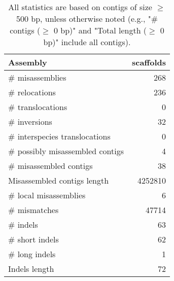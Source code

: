 \documentclass[12pt,a4paper]{article}
\begin{document}
\begin{table}[ht]
\begin{center}
\caption{All statistics are based on contigs of size $\geq$ 500 bp, unless otherwise noted (e.g., "\# contigs ($\geq$ 0 bp)" and "Total length ($\geq$ 0 bp)" include all contigs).}
\begin{tabular}{|l*{1}{|r}|}
\hline
Assembly & scaffolds \\ \hline
\# misassemblies & 268 \\ \hline
\hspace{5mm}\# relocations & 236 \\ \hline
\hspace{5mm}\# translocations & 0 \\ \hline
\hspace{5mm}\# inversions & 32 \\ \hline
\hspace{5mm}\# interspecies translocations & 0 \\ \hline
\# possibly misassembled contigs & 4 \\ \hline
\# misassembled contigs & 38 \\ \hline
Misassembled contigs length & 4252810 \\ \hline
\# local misassemblies & 6 \\ \hline
\# mismatches & 47714 \\ \hline
\# indels & 63 \\ \hline
\hspace{5mm}\# short indels & 62 \\ \hline
\hspace{5mm}\# long indels & 1 \\ \hline
Indels length & 72 \\ \hline
\end{tabular}
\end{center}
\end{table}
\end{document}
